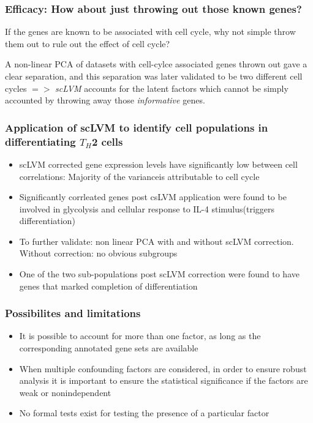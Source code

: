 \documentclass[10pt, compress]{beamer}
\renewcommand{\(}{\begin{columns}}
\renewcommand{\)}{\end{columns}}
\newcommand{\<}[1]{\begin{column}{#1}}
\renewcommand{\>}{\end{column}}
\begin{document}
\begin{frame}
\frametitle{Efficacy: How about just throwing out those known genes?}
If the genes are known to be associated with cell cycle, why not simple throw them out to rule out the 
effect of cell cycle?

A non-linear PCA of datasets with cell-cylce associated genes thrown out gave a clear separation, and this separation
was later validated to be two different cell cycles $=>$ \textit{scLVM} accounts for the latent factors which
cannot be simply accounted by throwing away those \textit{informative} genes.

\end{frame}

\begin{frame}
\frametitle{Application of scLVM to identify cell populations in differentiating $T_H$2 cells}

\begin{itemize}[<+- | alert@+>]
\item scLVM corrected gene expression levels have significantly low between cell correlations: Majority of the varianceis attributable to cell cycle
\item Significantly corrleated genes post csLVM application were found to be involved in glycolysis and cellular response to IL-4 stimulus(triggers differentiation)
\item To further validate: non linear PCA with and without scLVM correction. Without correction: no obvious subgroups
\item One of the two sub-populations post scLVM correction were found to have genes that marked completion of differentiation

\end{itemize}
\end{frame}

\begin{frame}
\frametitle{Possibilites and limitations}
\begin{itemize}[<+- | alert@+>]
\item It is possible to account for more than one factor, as long as the corresponding annotated gene sets are available
\item When multiple confounding factors are considered, in order to ensure robust analysis it is important to ensure
the statistical significance if the factors are weak or nonindependent
\item No formal tests exist for testing the presence of a particular factor

\end{itemize}
\end{frame}
\end{document}
